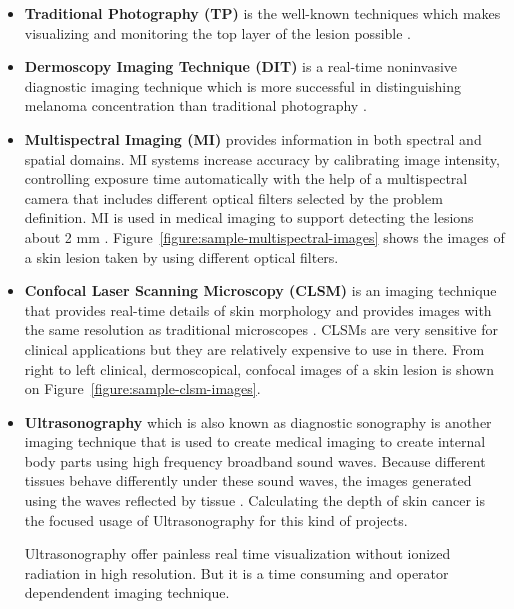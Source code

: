         \begin{itemize}

            \item \textbf{Traditional Photography (TP)} is the well-known techniques which makes visualizing and monitoring the top layer of the lesion possible \cite{feit2004melanomas}.

            \item \textbf{Dermoscopy Imaging Technique (DIT)} is a real-time noninvasive diagnostic imaging technique
                    which is more successful in distinguishing melanoma concentration than traditional photography \cite{aljanabi2019various}.

            \item \textbf{Multispectral Imaging (MI)} provides information in both spectral and spatial domains.
                    MI systems increase accuracy by calibrating image intensity,
                    controlling exposure time automatically with the help of a multispectral camera that includes different optical filters selected by the problem definition.
                    MI is used in medical imaging to support  detecting the lesions about 2 mm \cite{aljanabi2019various}.
                    Figure~\ref{figure:sample-multispectral-images} shows the images of a skin lesion taken by using different optical filters.

                    

            \item \textbf{Confocal Laser Scanning Microscopy (CLSM)} is an imaging technique that provides real-time details of skin morphology
                    and provides images with the same resolution as traditional microscopes \cite{gerger2005diagnostic}.
                    CLSMs are very sensitive for clinical applications but they are relatively expensive to use in there.
                    From right to left clinical, dermoscopical, confocal images of a skin lesion is shown on Figure~\ref{figure:sample-clsm-images}.

                    

            \item \textbf{Ultrasonography} which is also known as diagnostic sonography is another imaging technique that is used to create medical imaging to create internal body parts using high frequency broadband sound waves.
                    Because different tissues behave differently under these sound waves,  the images generated using the waves reflected by tissue \cite{sahuquillo2013study}.
                    Calculating the depth of skin cancer is the focused usage of Ultrasonography for this kind of projects.

                    Ultrasonography offer painless real time visualization without ionized radiation in high resolution.
                    But it is a time consuming and operator dependendent imaging technique.

        \end{itemize}
